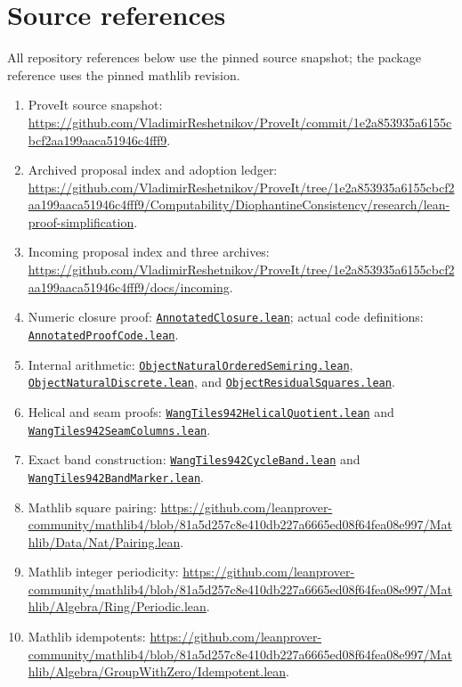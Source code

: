 \documentclass[11pt,letterpaper]{article}
\newcommand{\src}[2]{\href{https://github.com/VladimirReshetnikov/ProveIt/blob/1e2a853935a6155cbcf2aa199aaca51946c4fff9/Computability/DiophantineConsistency/Lean/DiophantineConsistency/#1.lean}{\nolinkurl{#2}}}
\begin{document}
\section{Source references}
All repository references below use the pinned source snapshot; the package reference uses the pinned mathlib revision.
\begin{enumerate}
\item ProveIt source snapshot: \url{https://github.com/VladimirReshetnikov/ProveIt/commit/1e2a853935a6155cbcf2aa199aaca51946c4fff9}.
\item Archived proposal index and adoption ledger: \url{https://github.com/VladimirReshetnikov/ProveIt/tree/1e2a853935a6155cbcf2aa199aaca51946c4fff9/Computability/DiophantineConsistency/research/lean-proof-simplification}.
\item Incoming proposal index and three archives: \url{https://github.com/VladimirReshetnikov/ProveIt/tree/1e2a853935a6155cbcf2aa199aaca51946c4fff9/docs/incoming}.
\item Numeric closure proof: \src{AnnotatedClosure}{AnnotatedClosure.lean}; actual code definitions: \src{AnnotatedProofCode}{AnnotatedProofCode.lean}.
\item Internal arithmetic: \src{ObjectNaturalOrderedSemiring}{ObjectNaturalOrderedSemiring.lean}, \src{ObjectNaturalDiscrete}{ObjectNaturalDiscrete.lean}, and \src{ObjectResidualSquares}{ObjectResidualSquares.lean}.
\item Helical and seam proofs: \src{WangTiles942HelicalQuotient}{WangTiles942HelicalQuotient.lean} and \src{WangTiles942SeamColumns}{WangTiles942SeamColumns.lean}.
\item Exact band construction: \src{WangTiles942CycleBand}{WangTiles942CycleBand.lean} and \src{WangTiles942BandMarker}{WangTiles942BandMarker.lean}.
\item Mathlib square pairing: \url{https://github.com/leanprover-community/mathlib4/blob/81a5d257c8e410db227a6665ed08f64fea08e997/Mathlib/Data/Nat/Pairing.lean}.
\item Mathlib integer periodicity: \url{https://github.com/leanprover-community/mathlib4/blob/81a5d257c8e410db227a6665ed08f64fea08e997/Mathlib/Algebra/Ring/Periodic.lean}.
\item Mathlib idempotents: \url{https://github.com/leanprover-community/mathlib4/blob/81a5d257c8e410db227a6665ed08f64fea08e997/Mathlib/Algebra/GroupWithZero/Idempotent.lean}.
\end{enumerate}

\appendix
\end{document}
